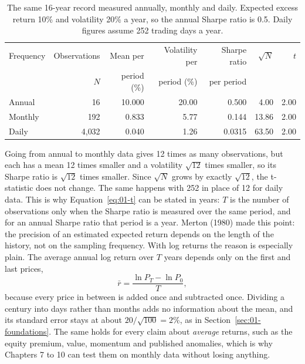 \begin{table}[htbp]
\centering
\small
\caption{The same 16-year record measured annually, monthly and daily. Expected excess return 10\% and volatility 20\% a year, so the annual Sharpe ratio is 0.5. Daily figures assume 252 trading days a year.}
\label{tab:01-frequency}
\begin{tabular}{@{}lrrrrrr@{}}
\toprule
Frequency & Observations & Mean per & Volatility per & Sharpe ratio & $\sqrt{N}$ & $t$ \\
 & $N$ & period (\%) & period (\%) & per period & & \\
\midrule
Annual  & 16    & 10.000 & 20.00 & 0.500  & 4.00  & 2.00 \\
Monthly & 192   & 0.833  & 5.77  & 0.144  & 13.86 & 2.00 \\
Daily   & 4{,}032 & 0.040 & 1.26  & 0.0315 & 63.50 & 2.00 \\
\bottomrule
\end{tabular}
\end{table}

Going from annual to monthly data gives 12 times as many observations, but each has a mean 12 times smaller and a volatility $\sqrt{12}$ times smaller, so its Sharpe ratio is $\sqrt{12}$ times smaller. Since $\sqrt{N}$ grows by exactly $\sqrt{12}$, the t-statistic does not change. The same happens with 252 in place of 12 for daily data. This is why Equation~\eqref{eq:01-t} can be stated in years: $T$ is the number of observations only when the Sharpe ratio is measured over the same period, and for an annual Sharpe ratio that period is a year. Merton (1980) made this point: the precision of an estimated expected return depends on the length of the history, not on the sampling frequency. With log returns the reason is especially plain. The average annual log return over $T$ years depends only on the first and last prices,
\begin{equation}
  \bar{r} = \frac{\ln P_T - \ln P_0}{T}, \nonumber
\end{equation}
because every price in between is added once and subtracted once. Dividing a century into days rather than months adds no information about the mean, and its standard error stays at about $20/\sqrt{100} = 2$\%, as in Section~\ref{sec:01-foundations}. The same holds for every claim about \emph{average} returns, such as the equity premium, value, momentum and published anomalies, which is why Chapters 7 to 10 can test them on monthly data without losing anything.

